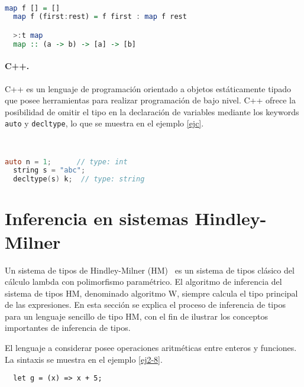 \begin{ej} \ \\
  \normalfont
  \label{haskellpoly}
\begin{lstlisting}[language=Haskell]
  map f [] = []
  map f (first:rest) = f first : map f rest

  >:t map
  map :: (a -> b) -> [a] -> [b]
\end{lstlisting}
\end{ej}

\paragraph{C++.} C++ es un lenguaje de programación orientado a objetos estáticamente tipado que posee herramientas para realizar programación de bajo nivel. C++ ofrece la posibilidad de omitir el tipo en la declaración de variables mediante los keywords \texttt{auto} y \texttt{decltype}, lo que se muestra en el ejemplo \ref{ejc}.

\begin{ej} \ \\
  \normalfont
  \label{ejc}
\begin{lstlisting}[language=C,morekeywords={decltype,string}]
  auto n = 1;      // type: int
  string s = "abc";
  decltype(s) k;  // type: string
\end{lstlisting}
\end{ej}

\section{Inferencia en sistemas Hindley-Milner}

Un sistema de tipos de Hindley-Milner (HM)~\cite{damasmilner} es un sistema de tipos clásico del cálculo lambda con polimorfismo paramétrico. El algoritmo de inferencia del sistema de tipos HM, denominado algoritmo W, siempre calcula el tipo principal de las expresiones. En esta sección se explica el proceso de inferencia de tipos para un lenguaje sencillo de tipo HM, con el fin de ilustrar los conceptos importantes de inferencia de tipos.

El lenguaje a considerar posee operaciones aritméticas entre enteros y funciones. La sintaxis se muestra en el ejemplo \ref{ej2-8}.

\vspace{0.8em}
\begin{ej}
  \normalfont
  \label{ej2-8}
\begin{lstlisting}
  let g = (x) => x + 5;
\end{lstlisting}
\end{ej}

